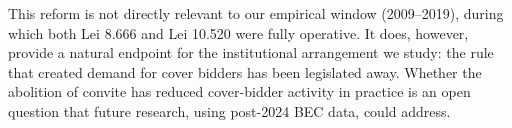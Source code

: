 This reform is not directly relevant to our empirical window
(2009--2019), during which both Lei 8.666 and Lei 10.520 were
fully operative. It does, however, provide a natural endpoint for
the institutional arrangement we study: the rule that created
demand for cover bidders has been legislated away. Whether the
abolition of convite has reduced cover-bidder activity in
practice is an open question that future research, using
post-2024 BEC data, could address.
